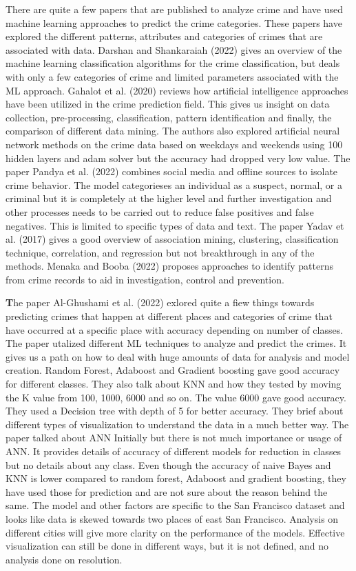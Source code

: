 \documentclass[conference,final,]{IEEEtran}
\begin{document}
There are quite a few papers that are published to analyze crime and
have used machine learning approaches to predict the crime categories.
These papers have explored the different patterns, attributes and
categories of crimes that are associated with data. Darshan and
Shankaraiah (2022) gives an overview of the machine learning
classification algorithms for the crime classification, but deals with
only a few categories of crime and limited parameters associated with
the ML approach. Gahalot et al. (2020) reviews how artificial
intelligence approaches have been utilized in the crime prediction
field. This gives us insight on data collection, pre-processing,
classification, pattern identification and finally, the comparison of
different data mining. The authors also explored artificial neural network 
methods on the crime data based on weekdays and weekends using 100 hidden layers
and adam solver but the accuracy had dropped very low value. The paper 
Pandya et al. (2022) combines social media and offline sources to isolate crime
behavior. The model categorieses an individual as a suspect, normal, or
a criminal but it is completely at the higher level and further
investigation and other processes needs to be carried out to reduce
false positives and false negatives. This is limited to specific types
of data and text. The paper Yadav et al. (2017) gives a good overview of
association mining, clustering, classification technique, correlation,
and regression but not breakthrough in any of the methods. Menaka and
Booba (2022) proposes approaches to identify patterns from crime records
to aid in investigation, control and prevention.  

\textbf The paper Al-Ghushami et al. (2022) exlored quite a fiew things
towards predicting crimes that happen at different places and categories
of crime that have occurred at a specific place with accuracy depending on
number of classes. The paper utalized different ML techniques to analyze 
and predict the crimes. It gives us a path on how to deal with huge amounts
of data for analysis and model creation. Random Forest, Adaboost and
Gradient boosting gave good accuracy for different classes. They also
talk about KNN and how they tested by moving the K value from 100, 1000,
6000 and so on. The value 6000 gave good accuracy. They used a Decision
tree with depth of 5 for better accuracy. They brief about different
types of visualization to understand the data in a much better way. The paper 
talked about ANN Initially but there is not much importance or usage of ANN. 
It provides details of accuracy of different models for reduction in
classes but no details about any class. Even though the accuracy of
naive Bayes and KNN is lower compared to random forest, Adaboost and
gradient boosting, they have used those for prediction and are not sure
about the reason behind the same. The model and other factors are
specific to the San Francisco dataset and looks like data is skewed
towards two places of east San Francisco. Analysis on different cities
will give more clarity on the performance of the models. Effective
visualization can still be done in different ways, but it is not
defined, and no analysis done on resolution.
\end{document}
